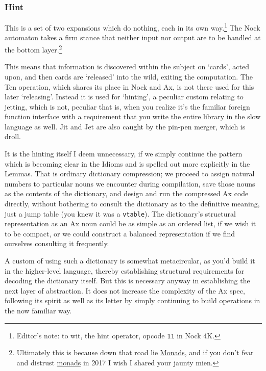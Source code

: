 \documentclass[twoside]{article}
\begin{document}
\subsubsection{Hint}

This is a set of two expansions which do nothing, each in its own way.\footnote{Editor's note:  to wit, the hint operator, opcode \texttt{11} in Nock 4K.}  The Nock automaton takes a firm stance that neither input nor output are to be handled at the bottom layer.\footnote{Ultimately this is because down that road lie \href{https://wiki.haskell.org/Monad}{Monads}, and if you don't fear and distrust \href{https://en.wikipedia.org/wiki/Monad}{monads} in 2017 I wish I shared your jaunty mien.}

This means that information is discovered within the subject on `cards', acted upon, and then cards are `released' into the wild, exiting the computation. The Ten operation, which shares its place in Nock and Ax, is not there used for this later `releasing'. Instead it is used for `hinting', a peculiar custom relating to jetting, which is not, peculiar that is, when you realize it's the familiar foreign function interface with a requirement that you write the entire library in the slow language as well. Jit and Jet are also caught by the pin-pen merger, which is droll.

It is the hinting itself I deem unnecessary, if we simply continue the pattern which is becoming clear in the Idioms and is spelled out more explicitly in the Lemmas. That is ordinary dictionary compression; we proceed to assign natural numbers to particular nouns we encounter during compilation, save those nouns as the contents of the dictionary, and design and run the compressed Ax code directly, without bothering to consult the dictionary as to the definitive meaning, just a jump table (you knew it was a \texttt{vtable}). The dictionary's
structural representation as an Ax noun could be as simple as an ordered list, if we wish it to be compact, or we could construct a balanced representation if we find ourselves consulting it frequently.

A custom of using such a dictionary is somewhat meta\-circular, as you'd build it in the higher-level language, thereby establishing structural requirements for decoding the dictionary itself. But this is necessary anyway in establishing the next layer of abstraction. It does not increase the complexity of the Ax spec, following its spirit as well as its letter by simply continuing to build operations in the now familiar way.
\end{document}
